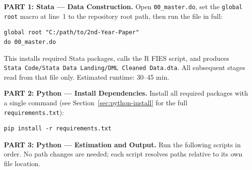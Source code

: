 \documentclass[11pt]{article}
\begin{document}
\medskip
\textbf{PART 1: Stata --- Data Construction.}
Open \texttt{00\_master.do}, set the \texttt{global root} macro at line~1
to the repository root path, then run the file in full:

\begin{lstlisting}
global root "C:/path/to/2nd-Year-Paper"
do 00_master.do
\end{lstlisting}

This installs required Stata packages, calls the R FIES script, and
produces \texttt{Stata Code/Stata Data Landing/DML Cleaned Data.dta}.
All subsequent stages read from that file only. Estimated runtime: 30--45 min.

\medskip
\textbf{PART 2: Python --- Install Dependencies.}
Install all required packages with a single command (see
Section~\ref{sec:python-install} for the full \texttt{requirements.txt}):

\begin{lstlisting}
pip install -r requirements.txt
\end{lstlisting}

\medskip
\textbf{PART 3: Python --- Estimation and Output.}
Run the following scripts in order. No path changes are needed; each script
resolves paths relative to its own file location.
\end{document}
